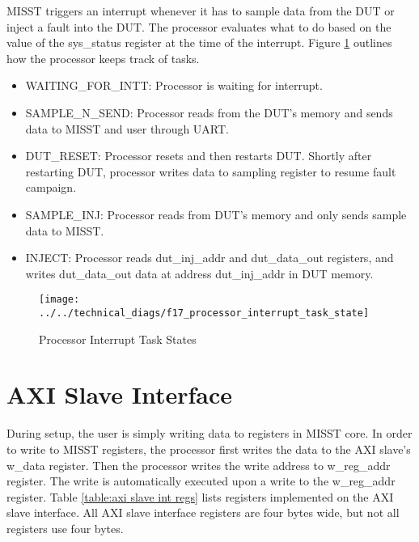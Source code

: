 \documentclass[]{report}
\begin{document}
 MISST triggers an interrupt whenever it has to sample data from the DUT or inject a fault into the DUT. The processor evaluates what to do based on the value of the sys\_status register at the time of the interrupt. Figure \ref{fig:processorinterrupttaskstate} outlines how the processor keeps track of tasks. 
 \begin{itemize}
 	\item WAITING\_FOR\_INTT: Processor is waiting for interrupt.
 	\item SAMPLE\_N\_SEND: Processor reads from the DUT's memory and sends data to MISST and user through UART.
 	\item DUT\_RESET: Processor resets and then restarts DUT. Shortly after restarting DUT, processor writes data to sampling register to resume fault campaign.\\
 	\item SAMPLE\_INJ: Processor reads from DUT's memory and only sends sample data to MISST.\\
 	\item INJECT: Processor reads dut\_inj\_addr and dut\_data\_out registers, and writes dut\_data\_out data at address dut\_inj\_addr in DUT memory.
 \end{itemize} 

\begin{figure}[h]
	\centering
	\texttt{[image: ../../technical\_diags/f17\_processor\_interrupt\_task\_state]}
	\caption{Processor Interrupt Task States}
	\label{fig:processorinterrupttaskstate}
\end{figure}

\clearpage
\section{AXI Slave Interface}
\label{s axi slave interface}

During setup, the user is simply writing data to registers in MISST core. In order to write to MISST registers, the processor first writes the data to the AXI slave's w\_data register. Then the processor writes the write address to w\_reg\_addr register. The write is automatically executed upon a write to the w\_reg\_addr register. Table \ref{table:axi slave int regs} lists registers implemented on the AXI slave interface. All AXI slave interface registers are four bytes wide, but not all registers use four bytes.
\end{document}
